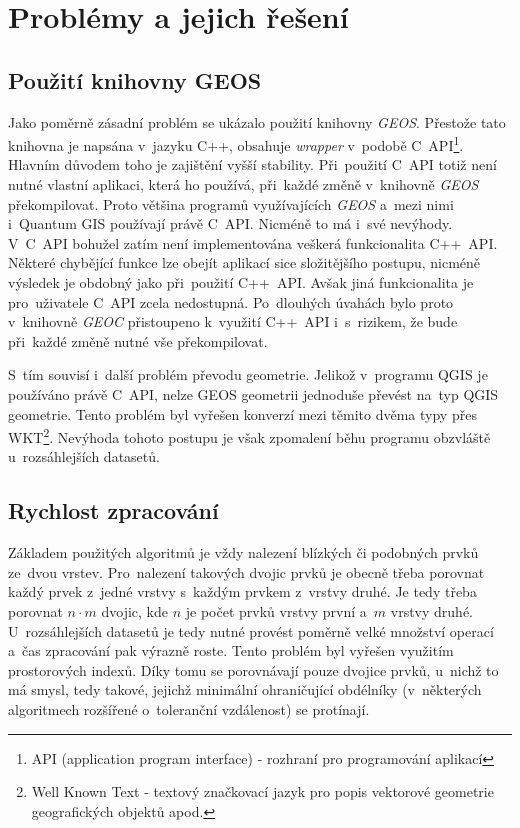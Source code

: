 \chapter{Problémy a jejich řešení}
\label{7-problemy}

\section{Použití knihovny GEOS}
\label{geos problem}
Jako poměrně zásadní problém se ukázalo použití knihovny \textit{GEOS}. 
Přestože tato knihovna je napsána v~jazyku C++, obsahuje \textit{wrapper} 
v~podobě C~API\footnote{API (application program interface) - rozhraní 
pro programování aplikací}. Hlavním důvodem toho je zajištění vyšší 
stability. Při~použití C~API totiž není nutné vlastní aplikaci,
která ho používá, při~každé změně v~knihovně \textit{GEOS} překompilovat. 
Proto většina programů využívajících \textit{GEOS} a~mezi nimi i~Quantum 
GIS používají právě C~API. Nicméně to má i~své nevýhody. V~C~API bohužel 
zatím není implementována veškerá funkcionalita C++~API. Některé chybějící 
funkce lze obejít aplikací sice složitějšího postupu, nicméně výsledek je 
obdobný jako při~použití C++~API. Avšak jiná funkcionalita je pro~uživatele 
C~API zcela nedostupná. Po~dlouhých úvahách bylo proto v~knihovně 
\textit{GEOC} přistoupeno k~využití C++~API i~s~rizikem, že bude při~každé 
změně nutné vše překompilovat. %

S~tím souvisí i~další problém převodu geometrie. Jelikož v~programu QGIS je 
používáno právě C~API, nelze GEOS geometrii jednoduše převést na~typ QGIS 
geometrie. Tento problém byl vyřešen konverzí mezi těmito dvěma typy přes 
WKT\footnote{Well Known Text - textový značkovací jazyk pro popis vektorové 
geometrie geografických objektů apod.}. Nevýhoda tohoto postupu je však 
zpomalení běhu programu obzvláště u~rozsáhlejších datasetů. 

\section{Rychlost zpracování}
\label{rychlost}

Základem použitých algoritmů je vždy nalezení blízkých či podobných prvků 
ze~dvou vrstev. Pro~nalezení takových dvojic prvků je obecně třeba porovnat 
každý prvek z~jedné vrstvy s~každým prvkem z~vrstvy druhé. Je tedy třeba 
porovnat $n\cdot m$ dvojic, kde $n$ je počet prvků vrstvy první a~$m$ vrstvy 
druhé. U~rozsáhlejších datasetů je tedy nutné provést poměrně velké množství 
operací a~čas zpracování pak výrazně roste. Tento problém byl vyřešen využitím 
prostorových indexů. Díky tomu se porovnávají pouze dvojice prvků, u~nichž to 
má smysl, tedy takové, jejichž minimální ohraničující obdélníky (v~některých 
algoritmech rozšířené o~toleranční vzdálenost) se protínají.

